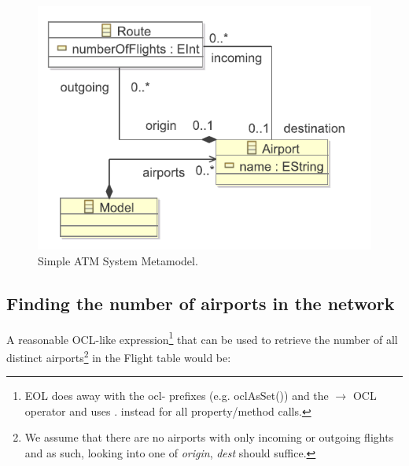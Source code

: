 \begin{figure}[ht]
	\centering
	\includegraphics[width=.8\textwidth]{images/atms.pdf}
	\caption{Simple ATM System Metamodel.}
	\label{fig:atms}
\end{figure}


%

\subsection{Finding the number of airports in the network}

A reasonable OCL-like expression\footnote{EOL does away with the ocl- prefixes (e.g. oclAsSet()) and the $\rightarrow$ OCL operator and uses . instead for all property/method calls.} that can be used to retrieve the number of all distinct airports\footnote{We assume that there are no airports with only incoming or outgoing flights and as such, looking into one of \emph{origin}, \emph{dest} should suffice.} in the Flight table would be:


